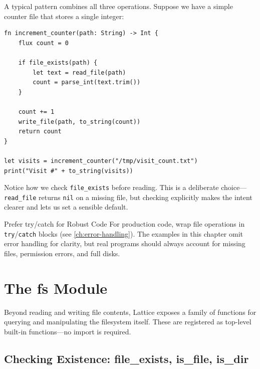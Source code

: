 A typical pattern combines all three operations. Suppose we have a simple
counter file that stores a single integer:

\begin{lstlisting}[language=Lattice, caption={Incrementing a persistent counter}]
fn increment_counter(path: String) -> Int {
    flux count = 0

    if file_exists(path) {
        let text = read_file(path)
        count = parse_int(text.trim())
    }

    count += 1
    write_file(path, to_string(count))
    return count
}

let visits = increment_counter("/tmp/visit_count.txt")
print("Visit #" + to_string(visits))
\end{lstlisting}

Notice how we check \lstinline|file_exists| before reading. This is a
deliberate choice---\lstinline|read_file| returns \lstinline|nil| on a missing
file, but checking explicitly makes the intent clearer and lets us set a
sensible default.

\begin{tipbox}{Prefer try/catch for Robust Code}
For production code, wrap file operations in \lstinline|try|/\lstinline|catch|
blocks (see \cref{ch:error-handling}). The examples in this chapter omit
error handling for clarity, but real programs should always account for
missing files, permission errors, and full disks.
\end{tipbox}

\section{The fs Module}\label{sec:fs-module}


Beyond reading and writing file contents, Lattice exposes a family of
functions for querying and manipulating the filesystem itself. These are
registered as top-level built-in functions---no import is required.

\subsection{Checking Existence: file\_exists, is\_file, is\_dir}
\label{sec:checking-existence}

